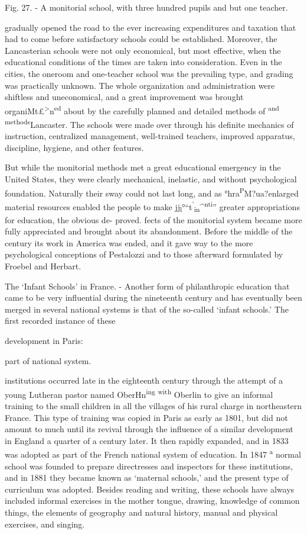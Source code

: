 \documentclass[
]{book}
\begin{document}
Fig. 27. - A monitorial school, with three hundred pupils and but one teacher.

gradually opened the road to the ever increasing expenditures and taxation that had to come before satisfactory schools could be established. Moreover, the Lancasterian schools were not only economical, but most effective, when the educational conditions of the times are taken into consideration. Even in the cities, the oneroom and one-teacher school was the prevailing type, and grading was practically unknown. The whole organization and administration were shiftless and uneconomical, and a great improvement was brought organiMt£\textsuperscript{\textgreater{}}n\textsuperscript{ed} about by the carefully planned and detailed methods of \textsuperscript{and} \textsuperscript{methods}Lancaster. The schools were made over through his definite mechanics of instruction, centralized management, well-trained teachers, improved apparatus, discipline, hygiene, and other features.

But while the monitorial methods met a great educational emergency in the United States, they were clearly mechanical, inelastic, and without psychological foundation. Naturally their sway could not last long, and as °hra\textsuperscript{P}M?ua?enlarged material resources enabled the people to make jj\textsubscript{l}°``t\textsuperscript{'}\textsubscript{in}\^{}\textsuperscript{nti}'' greater appropriations for education, the obvious de- proved. fects of the monitorial system became more fully appreciated and brought about its abandonment. Before the middle of the century its work in America was ended, and it gave way to the more psychological conceptions of Pestalozzi and to those afterward formulated by Froebel and Herbart.

The `Infant Schools' in France. - Another form of philanthropic education that came to be very influential during the nineteenth century and has eventually been merged in several national systems is that of the so-called `infant schools.' The first recorded instance of these

development in Paris:

part of national system.

institutions occurred late in the eighteenth century through the attempt of a young Lutheran pastor named OberHn\textsuperscript{ing} \textsuperscript{with} Oberlin to give an informal training to the small children in all the villages of his rural charge in northeastern France. This type of training was copied in Paris as early as 1801, but did not amount to much until its revival through the influence of a similar development in England a quarter of a century later. It then rapidly expanded, and in 1833 was adopted as part of the French national system of education. In 1847 \textsuperscript{a} normal school was founded to prepare directresses and inspectors for these institutions, and in 1881 they became known as `maternal schools,' and the present type of curriculum was adopted. Besides reading and writing, these schools have always included informal exercises in the mother tongue, drawing, knowledge of common things, the elements of geography and natural history, manual and physical exercises, and singing.
\end{document}
